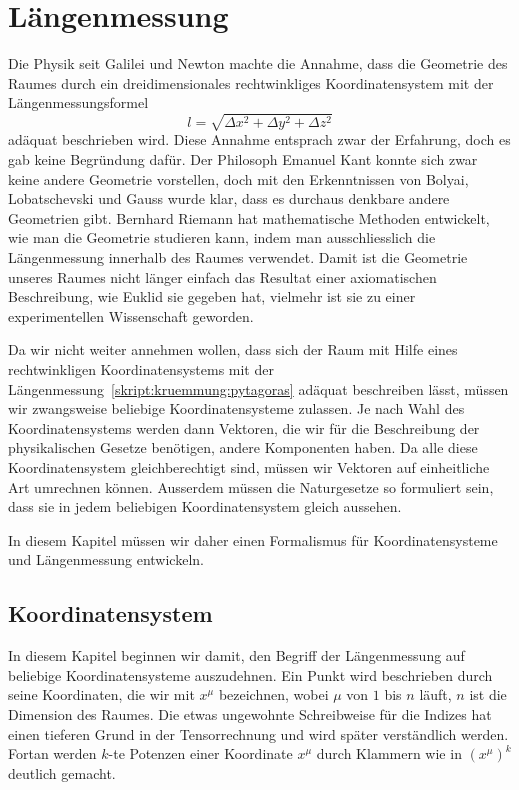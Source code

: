 %
%
%
\chapter{Längenmessung
\label{skript:chapter:laengenmessung}}
\rhead{}

Die Physik seit Galilei und Newton machte die Annahme, dass die
%
%
Geometrie des Raumes durch ein dreidimensionales rechtwinkliges
Koordinatensystem mit der Längenmessungsformel
\begin{equation}
l=\sqrt{\Delta x^2+\Delta y^2+\Delta z^2}
\label{skript:kruemmung:pytagoras}
\end{equation}
adäquat beschrieben wird.
Diese Annahme entsprach zwar der Erfahrung, doch es gab keine
Begründung dafür.
Der Philosoph Emanuel Kant konnte sich zwar keine andere Geometrie
%
vorstellen, doch mit den Erkenntnissen von Bolyai, Lobatschevski
%
%
%
und Gauss wurde klar, dass es durchaus denkbare andere Geometrien
gibt.
Bernhard Riemann hat mathematische Methoden entwickelt, wie man die
%
Geometrie studieren kann, indem man ausschliesslich die Längenmessung
innerhalb des Raumes verwendet.
Damit ist die Geometrie unseres Raumes nicht länger einfach das
Resultat einer axiomatischen Beschreibung, wie Euklid sie gegeben hat,
%
vielmehr ist sie zu einer experimentellen Wissenschaft geworden.

Da wir nicht weiter annehmen wollen, dass sich der Raum mit Hilfe
eines rechtwinkligen Koordinatensystems mit der
Längenmessung~\eqref{skript:kruemmung:pytagoras}
adäquat beschreiben lässt, müssen wir zwangsweise beliebige
Koordinatensysteme zulassen.
Je nach Wahl des Koordinatensystems werden dann Vektoren, die
wir für die Beschreibung der physikalischen Gesetze benötigen,
andere Komponenten haben.
Da alle diese Koordinatensystem gleichberechtigt sind, müssen
wir Vektoren auf einheitliche Art umrechnen können.
Ausserdem müssen die Naturgesetze so formuliert sein, dass
sie in jedem beliebigen Koordinatensystem gleich aussehen.

In diesem Kapitel müssen wir daher einen Formalismus für
Koordinatensysteme und Längenmessung entwickeln.

\section{Koordinatensystem}
In diesem Kapitel beginnen wir damit, den Begriff der Längenmessung
auf beliebige Koordinatensysteme auszudehnen.
Ein Punkt wird beschrieben durch seine Koordinaten, die wir mit
$x^\mu$ bezeichnen, wobei $\mu$ von $1$ bis $n$ läuft, $n$
ist die Dimension des Raumes. 
Die etwas ungewohnte Schreibweise für die Indizes
hat einen tieferen Grund in der Tensorrechnung und wird später
verständlich werden.
Fortan werden $k$-te Potenzen einer Koordinate $x^\mu$ durch
Klammern wie in $(x^\mu)^k$ deutlich gemacht.

